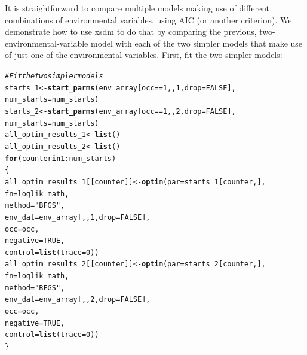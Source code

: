 \documentclass[11pt]{article}\usepackage[]{graphicx}\usepackage[]{xcolor}
\makeatletter
\newcommand{\hlnum}[1]{\textcolor[rgb]{0.686,0.059,0.569}{#1}}%
\newcommand{\hlsng}[1]{\textcolor[rgb]{0.192,0.494,0.8}{#1}}%
\newcommand{\hlcom}[1]{\textcolor[rgb]{0.678,0.584,0.686}{\textit{#1}}}%
\newcommand{\hlopt}[1]{\textcolor[rgb]{0,0,0}{#1}}%
\newcommand{\hldef}[1]{\textcolor[rgb]{0.345,0.345,0.345}{#1}}%
\newcommand{\hlkwa}[1]{\textcolor[rgb]{0.161,0.373,0.58}{\textbf{#1}}}%
\newcommand{\hlkwb}[1]{\textcolor[rgb]{0.69,0.353,0.396}{#1}}%
\newcommand{\hlkwc}[1]{\textcolor[rgb]{0.333,0.667,0.333}{#1}}%
\newcommand{\hlkwd}[1]{\textcolor[rgb]{0.737,0.353,0.396}{\textbf{#1}}}%
\newenvironment{kframe}{%
 \def\at@end@of@kframe{}%
 \ifinner\ifhmode%
  \def\at@end@of@kframe{\end{minipage}}%
  \begin{minipage}{\columnwidth}%
 \fi\fi%
 \def\FrameCommand##1{\hskip\@totalleftmargin \hskip-\fboxsep
 \colorbox{shadecolor}{##1}\hskip-\fboxsep
     \hskip-\linewidth \hskip-\@totalleftmargin \hskip\columnwidth}%
 \MakeFramed {\advance\hsize-\width
   \@totalleftmargin\z@ \linewidth\hsize
   \@setminipage}}%
 {\par\unskip\endMakeFramed%
 \at@end@of@kframe}
\newenvironment{knitrout}{}{} %
\makeatother
\begin{document}
It is straightforward to compare multiple models making use of different combinations of
environmental variables, using AIC (or another criterion). We demonstrate how to use
xsdm to do that by comparing the previous, two-environmental-variable model with each
of the two simpler models that make use of just one of the environmental variables.
First, fit the two simpler models:
\begin{knitrout}
\color{fgcolor}\begin{kframe}
\begin{alltt}
\hlcom{#Fit the two simpler models}
\hldef{starts_1} \hlkwb{<-} \hlkwd{start_parms}\hldef{(env_array[occ} \hlopt{==} \hlnum{1}\hldef{, ,}\hlnum{1}\hldef{,} \hlkwc{drop} \hldef{=} \hlnum{FALSE}\hldef{],}
                        \hlkwc{num_starts} \hldef{= num_starts)}
\hldef{starts_2} \hlkwb{<-} \hlkwd{start_parms}\hldef{(env_array[occ} \hlopt{==} \hlnum{1}\hldef{, ,}\hlnum{2}\hldef{,} \hlkwc{drop} \hldef{=} \hlnum{FALSE}\hldef{],}
                        \hlkwc{num_starts} \hldef{= num_starts)}
\hldef{all_optim_results_1} \hlkwb{<-} \hlkwd{list}\hldef{()}
\hldef{all_optim_results_2} \hlkwb{<-} \hlkwd{list}\hldef{()}
\hlkwa{for} \hldef{(counter} \hlkwa{in} \hlnum{1}\hlopt{:}\hldef{num_starts)}
\hldef{\{}
  \hldef{all_optim_results_1[[counter]]} \hlkwb{<-} \hlkwd{optim}\hldef{(}\hlkwc{par} \hldef{= starts_1[counter,],}
                                          \hlkwc{fn} \hldef{= loglik_math,}
                                          \hlkwc{method} \hldef{=} \hlsng{"BFGS"}\hldef{,}
                                          \hlkwc{env_dat} \hldef{= env_array[ , ,} \hlnum{1}\hldef{,} \hlkwc{drop} \hldef{=} \hlnum{FALSE}\hldef{],}
                                          \hlkwc{occ} \hldef{= occ,}
                                          \hlkwc{negative} \hldef{=} \hlnum{TRUE}\hldef{,}
                                          \hlkwc{control} \hldef{=} \hlkwd{list}\hldef{(}\hlkwc{trace} \hldef{=} \hlnum{0}\hldef{))}
  \hldef{all_optim_results_2[[counter]]} \hlkwb{<-} \hlkwd{optim}\hldef{(}\hlkwc{par} \hldef{= starts_2[counter,],}
                                          \hlkwc{fn} \hldef{= loglik_math,}
                                          \hlkwc{method} \hldef{=} \hlsng{"BFGS"}\hldef{,}
                                          \hlkwc{env_dat} \hldef{= env_array[ , ,} \hlnum{2}\hldef{,} \hlkwc{drop} \hldef{=} \hlnum{FALSE}\hldef{],}
                                          \hlkwc{occ} \hldef{= occ,}
                                          \hlkwc{negative} \hldef{=} \hlnum{TRUE}\hldef{,}
                                          \hlkwc{control} \hldef{=} \hlkwd{list}\hldef{(}\hlkwc{trace} \hldef{=} \hlnum{0}\hldef{))}
\hldef{\}}
\end{alltt}
\end{kframe}
\end{knitrout}
\end{document}
